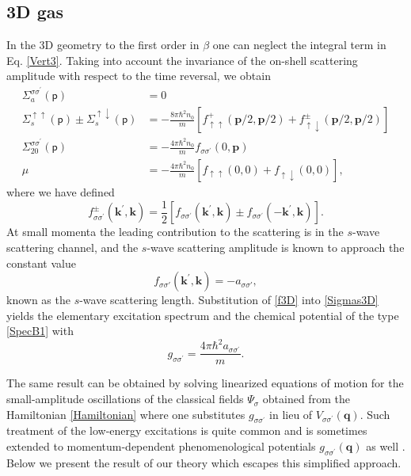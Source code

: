 \documentclass[reprint,superscriptaddress,showpacs,nofootinbib,aps,pra]{revtex4-1}
\begin{document}
\subsection{3D gas}

In the 3D geometry to the first order in $\beta$ one can neglect the integral term in Eq. \eqref{Vert3}. Taking into account the invariance of the on-shell scattering amplitude with respect to the time reversal, we obtain
\begin{equation}
\label{Sigmas3D}
\begin{split}
\Sigma_{a}^{\sigma\sigma^\prime}(\mathsf p)&=0\\
\Sigma_s^{\uparrow\uparrow}(\mathsf p)\pm\Sigma_s^{\uparrow\downarrow}(\mathsf p)&=-\frac{8\pi\hbar^2 n_0}{m}[f_{\uparrow\uparrow}^{+}(\bm p/2,\bm p/2)+f_{\uparrow\downarrow}^{\pm}(\bm p/2,\bm p/2)]\\
\Sigma^{\sigma\sigma^\prime}_{20}(\mathsf p)&=-\frac{4\pi\hbar^2 n_0}{m}f_{\sigma\sigma^\prime}(0,\bm p)\\
\mu&=-\frac{4\pi\hbar^2 n_0}{m}[f_{\uparrow\uparrow}(0,0)+f_{\uparrow\downarrow}(0,0)],
\end{split}
\end{equation}
where we have defined
\begin{equation}
f_{\sigma\sigma^\prime}^{\pm}(\bm k^\prime,\bm k)=\frac{1}{2}[f_{\sigma\sigma^\prime}(\bm k^\prime,\bm k)\pm f_{\sigma\sigma^\prime}(-\bm k^\prime,\bm k)].
\end{equation}
At small momenta the leading contribution to the scattering is in the $s$-wave scattering channel, and the $s$-wave scattering amplitude is known to approach the constant value \cite{Taylor}
\begin{equation}
\label{f3D}
f_{\sigma\sigma'}(\bm k^\prime,\bm k)=-a_{\sigma\sigma'},
\end{equation}
known as the $s$-wave scattering length. Substitution of \eqref{f3D} into \eqref{Sigmas3D} yields the elementary excitation spectrum and the chemical potential of the type \eqref{SpecB1} with 
\begin{equation}
g_{\sigma\sigma^\prime}=\frac{4\pi\hbar^2 a_{\sigma\sigma^\prime}}{m}.
\end{equation}

The same result can be obtained by solving linearized equations of motion for the small-amplitude oscillations of the classical fields $\Psi_\sigma$ obtained from the Hamiltonian \eqref{Hamiltonian} where one substitutes $g_{\sigma\sigma^\prime}$ in lieu of  $V_{\sigma\sigma^\prime}(\bm q)$. Such treatment of the low-energy excitations is quite common \cite{Petrov2015, Goldstein, Berman} and is sometimes extended to momentum-dependent phenomenological potentials $g_{\sigma\sigma^\prime}(\bm q)$ as well \cite{ResonantPairing, Alexandrov, Eckardt}. Below we present the result of our theory which escapes this simplified approach.
\end{document}
